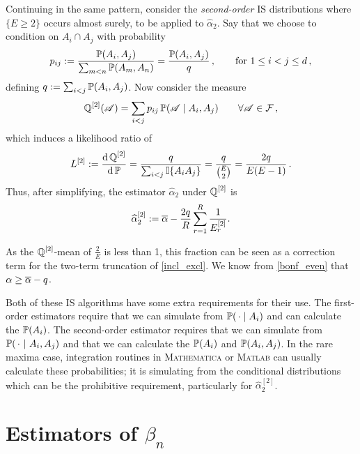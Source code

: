 Continuing in the same pattern, consider the \emph{second-order} IS distributions where $\{E \geq 2\}$ occurs almost surely, to be applied to $\hat{\alpha}_2$.
Say that we choose to condition on $A_i \cap A_j$ with probability
\[ p_{ij} := \frac{\operatorname{{\mathbb P}}(A_i,A_j)}{ \sum_{m<n} \operatorname{{\mathbb P}}(A_m,A_n) } = \frac{\operatorname{{\mathbb P}}(A_i,A_j)}{ q } \,,\qquad \text{for } 1 \le i < j \le d\,, \]
defining ${q} := \sum_{i<j} \operatorname{{\mathbb P}}(A_i, A_j)$. Now consider the measure
\[ \operatorname{\mathbb Q}^{[2]}( \mathscr{A} ) = \sum_{i<j} p_{ij} \operatorname{{\mathbb P}}( \mathscr{A} \mid A_i, A_j)  \qquad \forall \mathscr{A} \in \mathcal{F} \,, \]
which induces a likelihood ratio of
\[ L^{[2]} := \frac{\mathop{}\!\mathrm{d} \operatorname{\mathbb Q}^{[2]} }{ \mathop{}\!\mathrm{d} \operatorname{{\mathbb P}} } = \frac{ {q} }{ \sum_{i<j} \mathbb{I}\{ A_iA_j \}}
  = \frac{ {q} }{ \binom{ E }{2} } = \frac{2 {q} }{ E (E - 1) }  \,. \]
Thus, after simplifying, the estimator $\hat{\alpha}_2$ under $\operatorname{\mathbb Q}^{[2]}$ is
\begin{align} \label{alpha_2_IS_2}
  \hat{\alpha}_{2}^{[2]} \defeq
  \alphaMax -  \frac{2q}{R} \sum_{r=1}^R \frac{1}{E_r^{[2]}} .%
\end{align}


\begin{remark}
As the $\operatorname{\mathbb Q}^{[2]}$-mean of $\frac2{E}$ is less than 1, this fraction can be seen as a correction term for the two-term truncation of \eqref{incl_excl}. We know from \eqref{bonf_even} that $\alpha \ge \overline{\alpha} - q$. \remQED
\end{remark}

Both of these IS algorithms have some extra requirements for their use. The first-order estimators require
that we can simulate from $\operatorname{{\mathbb P}}(\,\cdot \mid A_i)$ and can calculate the $\operatorname{{\mathbb P}}(A_i)$.
The second-order estimator requires that we
can simulate from $\operatorname{{\mathbb P}}(\,\cdot~|~A_i, A_j)$ and that we can calculate the $\operatorname{{\mathbb P}}(A_i)$ and $\operatorname{{\mathbb P}}(A_i, A_j)$.
In the rare maxima case, integration routines in \textsc{Mathematica} or \textsc{Matlab} can usually calculate these probabilities; it is simulating from the conditional distributions which can be the prohibitive requirement, particularly for $\hat{\alpha}_{2}^{[2]}$.

\section{Estimators of $\beta_n$} \label{scn:beta_ests}

